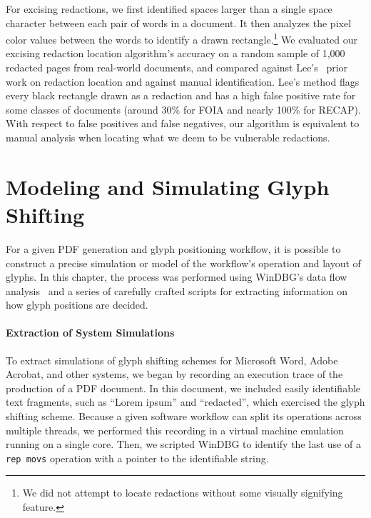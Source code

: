 For excising redactions, we first identified spaces larger than a single space character between each pair of words in a document.
It then analyzes the pixel color values between the words to identify a drawn rectangle.\footnote{
    We did not attempt to locate redactions without some visually signifying feature.
}
We evaluated our excising redaction location algorithm's accuracy on a random sample of 1,000 redacted pages from real-world documents, and compared against Lee's~\cite{timblee} prior work on redaction location and against manual identification.
Lee's method flags every black rectangle drawn as a redaction and has a high false positive rate for some classes of documents (around 30\% for FOIA and nearly 100\% for RECAP).
With respect to false positives and false negatives, our algorithm is equivalent to manual analysis when locating what we deem to be vulnerable redactions.

\section{Modeling and Simulating Glyph Shifting}

For a given PDF generation and glyph positioning workflow, it is possible to construct a precise simulation or model of the workflow's operation and layout of glyphs.
In this chapter, the process was performed using WinDBG's data flow analysis~\cite{timetravel} and a series of carefully crafted scripts for extracting information on how glyph positions are decided.

\paragraph{Extraction of System Simulations}
To extract simulations of glyph shifting schemes for Microsoft Word, Adobe Acrobat, and other systems, we began by recording an execution trace of the production of a PDF document.
In this document, we included easily identifiable text fragments, such as ``Lorem ipsum'' and ``redacted'', which exercised the glyph shifting scheme.
Because a given software workflow can split its operations across multiple threads, we performed this recording in a virtual machine emulation running on a single core.
Then, we scripted WinDBG to identify the last use of a \texttt{rep movs} operation with a pointer to the identifiable string.


